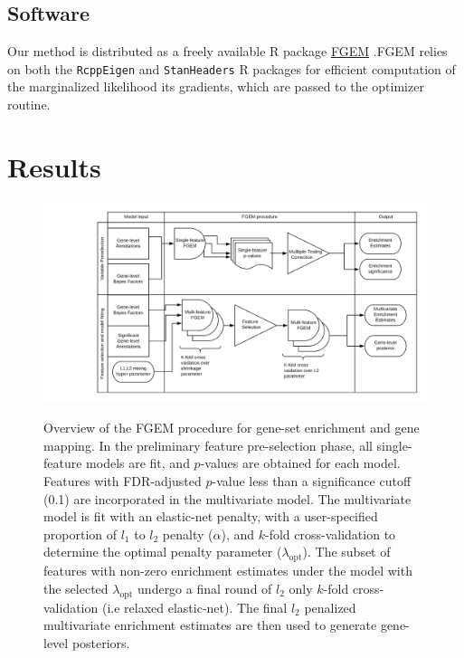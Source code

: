 \subsection{Software}\label{sec:org56b3320}

Our method is distributed as a freely available R package \href{https://github.com/CreRecombinase/FGEM}{FGEM} \cite{Rlang} .FGEM relies on both the \texttt{RcppEigen} \cite{RcppEigen} and  \texttt{StanHeaders} R packages for efficient computation of the marginalized likelihood its gradients, which are passed to the optimizer routine.  


\section{Results}\label{sec:org6fb4837}

\begin{figure}[h]
  \centering
  \includegraphics[width=.9\linewidth]{img/FGEM_procedure.png}\label{fig:overview}
  \caption{Overview of the FGEM procedure for gene-set enrichment and gene mapping.  In the preliminary feature pre-selection phase, all single-feature models are fit, and $p$-values are obtained for each model.
    Features with FDR-adjusted $p$-value less than a significance cutoff (0.1) are incorporated in the multivariate model. The multivariate model is fit with an elastic-net penalty, with a user-specified proportion of $l_1$
    to $l_2$ penalty ($\alpha$), and $k$-fold cross-validation to determine the optimal penalty parameter ($\lambda_{\text{opt}}$).  The subset of features with non-zero enrichment estimates under the model with the selected $\lambda_{\text{opt}}$ undergo a final round of $l_2$ only $k$-fold cross-validation (i.e relaxed elastic-net).  The final $l_2$ penalized multivariate enrichment estimates are then used to generate gene-level posteriors. }
\end{figure}


